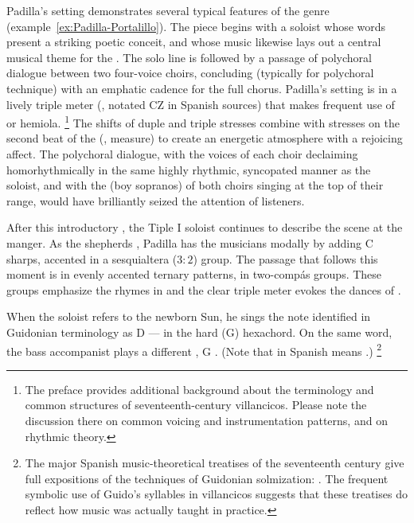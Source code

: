 %
%
Padilla's setting demonstrates several typical features of the genre (example~\ref{ex:Padilla-Portalillo}).
The piece begins with a soloist whose words present a striking poetic conceit, and whose music likewise lays out a central musical theme for the  .
The solo line is followed by a passage of polychoral dialogue between two four-voice choirs, concluding (typically for polychoral technique) with an emphatic cadence for the full chorus.
Padilla's setting is in a lively triple meter (, notated CZ in Spanish sources) that makes frequent use of  or hemiola.%
	\footnote{%
	The preface provides additional background about the terminology and common structures of seventeenth-century villancicos.
	Please note the discussion there on common voicing and instrumentation patterns, and on rhythmic theory.
	}
The shifts of duple and triple stresses combine with stresses on the second beat of the  (, measure) to create an energetic atmosphere with a rejoicing affect.
The polychoral dialogue, with the voices of each choir declaiming homorhythmically in the same highly rhythmic, syncopated manner as the soloist, and with the  (boy sopranos) of both choirs singing at the top of their range, would have brilliantly seized the attention of listeners.

After this introductory , the Tiple I soloist continues to describe the scene at the manger.
As the shepherds  , Padilla has the musicians  modally by adding C sharps, accented in a sesquialtera ($3:2$) group.
The passage that follows this moment is in evenly accented ternary patterns, in two-compás groups.
These groups emphasize the rhymes in  and the clear triple meter evokes the dances of .

When the soloist refers to the newborn Sun, he sings the note identified in Guidonian terminology as D --- in the hard (G) hexachord.
On the same word, the bass accompanist plays a different , G . 
(Note that  in Spanish means .)%
	\footnote{%
The major Spanish music-theoretical treatises of the seventeenth century give full expositions of the techniques of Guidonian solmization: \autocites{Cerone:Melopeo}{Lorente:Porque}.
The frequent symbolic use of Guido's syllables in villancicos suggests that these treatises do reflect how music was actually taught in practice.
	}

